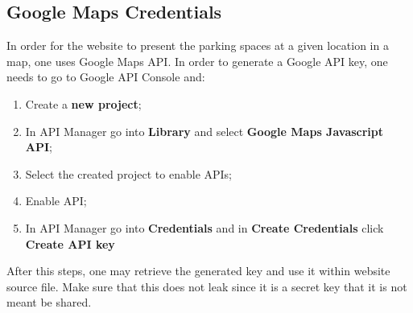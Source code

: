 \subsection{Google Maps Credentials}
In order for the website to present the parking spaces at a given location in a map, one uses Google Maps API. In order to generate a Google API key, one needs to go to Google API Console \cite{googleapi} and:

\begin{enumerate}
	\item Create a \textbf{new project};
	\item In API Manager go into \textbf{Library} and select \textbf{Google Maps Javascript API};
	\item Select the created project to enable APIs;
	\item Enable API;
	\item In API Manager go into \textbf{Credentials} and in \textbf{Create Credentials} click \textbf{Create API key}	
\end{enumerate}

After this steps, one may retrieve the generated key and use it within website source file. Make sure that this does not leak since it is a secret key that it is not meant be shared.